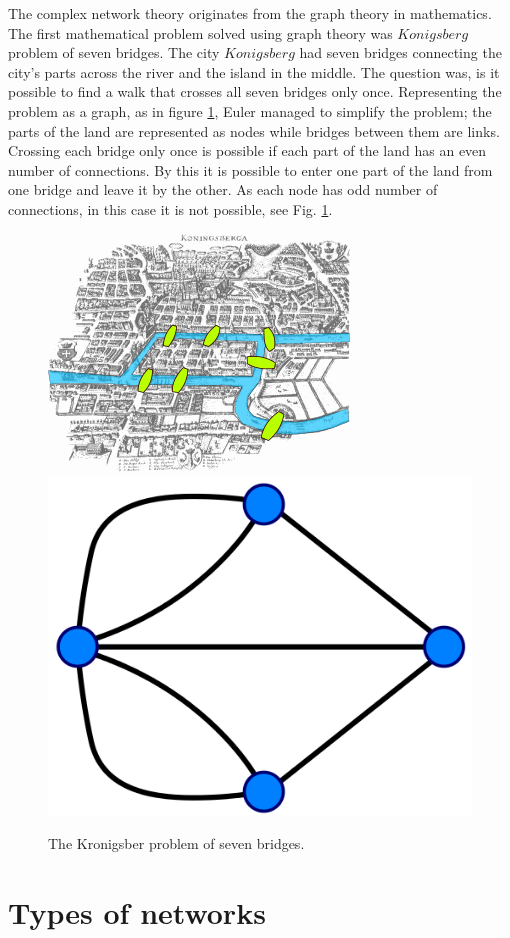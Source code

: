 The complex network theory originates from the graph theory in mathematics. %
The first mathematical problem solved using graph theory was $Konigsberg$ problem of seven bridges. The city $Konigsberg$ had seven bridges connecting the city's parts across the river and the island in the middle. The question was, is it possible to find a walk that crosses all seven bridges only once. Representing the problem as a graph, as in figure \ref{fig:Krgraph}, Euler managed to simplify the problem; the parts of the land are represented as nodes while bridges between them are links. Crossing each bridge only once is possible if each part of the land has an even number of connections. By this it is possible to enter one part of the land from one bridge and leave it by the other. As each node has odd number of connections, in this case it is not possible, see Fig. \ref{fig:Krgraph}.

\begin{figure}[!ht]
	\centering
	\includegraphics[width=0.3\linewidth]{Figures/Konigsberg_bridges.png} \hspace{2cm}
	\includegraphics[width=0.3\linewidth]{Figures/Konigsberg_graph.png}
	\caption{The Kronigsber problem of seven bridges.}
	\label{fig:Krgraph}
\end{figure}

\section{Types of networks}

